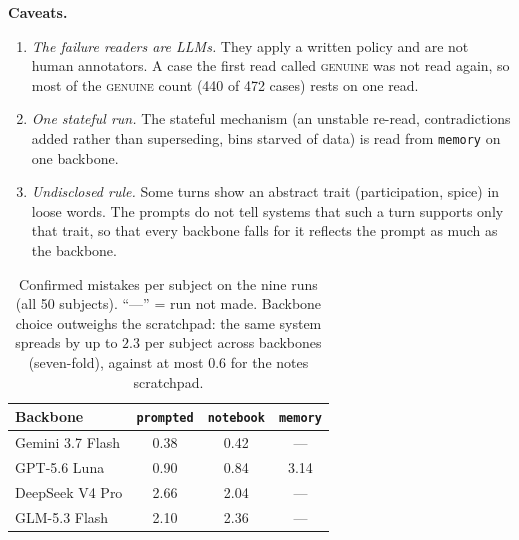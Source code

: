 \documentclass{article}
\begin{document}
\textbf{Caveats.}
\begin{enumerate}[leftmargin=*, itemsep=1pt, label=(\roman*)]
  \item \emph{The failure readers are LLMs.} They apply a written policy and are not human annotators. A
  case the first read called \textsc{genuine} was not read again, so most of the \textsc{genuine} count
  (440 of 472 cases) rests on one read.
  \item \emph{One stateful run.} The stateful mechanism (an unstable re-read, contradictions added
  rather than superseding, bins starved of data) is read from \texttt{memory} on one backbone.
  \item \emph{Undisclosed rule.} Some turns show an abstract trait (participation, spice) in loose
  words. The prompts do not tell systems that such a turn supports only that trait, so that every
  backbone falls for it reflects the prompt as much as the backbone.
\end{enumerate}

\begin{table}[h]
  \centering
  \caption{Confirmed mistakes per subject on the nine runs (all 50 subjects).
  ``---'' = run not made. Backbone choice outweighs the scratchpad: the same system spreads by up to
  $2.3$ per subject across backbones (seven-fold), against at most $0.6$ for the notes
  scratchpad.}
  \label{tab:fail-runs}
  \small
  \begin{tabular}{@{}lccc@{}}
    \toprule
    Backbone & \texttt{prompted} & \texttt{notebook} & \texttt{memory} \\
    \midrule
    Gemini 3.7 Flash & 0.38 & 0.42 & --- \\
    GPT-5.6 Luna     & 0.90 & 0.84 & 3.14 \\
    DeepSeek V4 Pro  & 2.66 & 2.04 & --- \\
    GLM-5.3 Flash    & 2.10 & 2.36 & --- \\
    \bottomrule
  \end{tabular}
\end{table}
\end{document}
